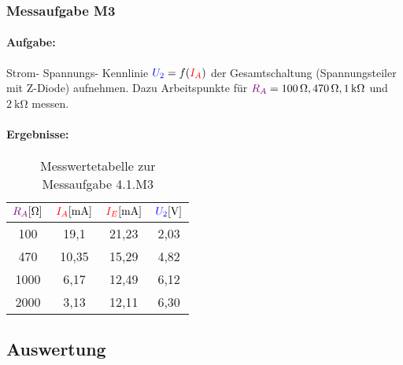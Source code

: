 \documentclass[11pt,a4paper,titlepage]{scrreprt}
\begin{document}
            \subsubsection{Messaufgabe M3}
              \paragraph{Aufgabe:} Strom- Spannungs- Kennlinie $\textcolor{blue}{U_2}= f(\textcolor{red}{I_A})$ der Gesamtschaltung (Spannungsteiler mit Z-Diode) aufnehmen. Dazu Arbeitspunkte für $\textcolor{violet}{R_A} = \SI{100}{\ohm}, \SI{470}{\ohm}, \SI{1}{\kilo\ohm}$ und $\SI{2}{\kilo\ohm}$ messen.
              \paragraph{Ergebnisse:}
              \begin{center}
                  \begin{table}[!hbtp]
                      \caption{Messwertetabelle zur Messaufgabe 4.1.M3}
                      \label{tbl:messergebnisse4.1}
                      \renewcommand{\arraystretch}{1.3}
                      \begin{center}
                          \begin{tabular}{c|ccc}
                              $\textcolor{violet}{R_A} [\si{\ohm}]$&
                              $\textcolor{red}{I_A} [\si{\milli\ampere}]$&
                              $\textcolor{red}{I_E} [\si{\milli\ampere}]$&
                              $\textcolor{blue}{U_2} [\si{\volt}]$\\ \hline

                              100 & 19,1 & 21,23 & 2,03\\
                              470 & 10,35 & 15,29 & 4,82\\
                              1000 & 6,17 & 12,49 & 6,12\\
                              2000 & 3,13 & 12,11 & 6,30\\
                          \end{tabular}
                      \end{center}
                  \end{table}
                  \end{center}

          \subsection{Auswertung}
\end{document}
